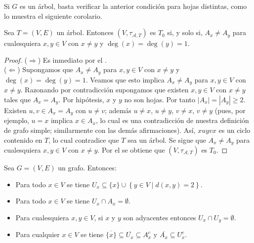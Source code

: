 Si $G$ es un árbol, basta verificar la anterior condición para hojas distintas, como lo muestra el siguiente corolario.
\begin{Cor}
   Sea $T=(V,E)$ un árbol. Entonces $(V,\tau_{\mathcal{A},T})$ es $T_0$ si, y solo si, $A_x\ne A_y$ para cualesquiera $x,y\in V$ con $x\ne y$ y $\operatorname{deg}(x)=\operatorname{deg}(y)=1$.
\end{Cor}
\begin{proof}
   ($\Rightarrow$) Es inmediato por el .\\
   ($\Leftarrow$) Supongamos que $A_x\ne A_y$ para $x,y\in V$ con $x\ne y$ y $\operatorname{deg}(x)=\operatorname{deg}(y)=1$. Veamos que esto implica $A_x\ne A_y$ para $x,y\in V$ con $x\ne y$. Razonando por contradicción supongamos que existen $x,y\in V$ con $x\ne y$ tales que $A_x=A_y$. Por hipótesis, $x$ y $y$ no son hojas. Por tanto $|A_x|=|A_y|\ge 2$. Existen $u,v\in A_x = A_y$ con $u\ne v$; además $u\ne x$, $u\ne y$, $v\ne x$, $v\ne y$ (pues, por ejemplo, $u=x$ implica $x\in A_x$, lo cual es una contradicción de nuestra definición de grafo simple; similarmente con las demás afirmaciones). Así, $xuyvx$ es un ciclo contenido en $T$, lo cual contradice que $T$ sea un árbol. Se sigue que $A_x\ne A_y$ para cualesquiera $x,y\in V$ con $x\ne y$. Por el  se obtiene que $(V,\tau_{\mathcal{A},T})$ es $T_0$.
\end{proof}
\begin{Cor}\label{Cor:U_x_3}
    Sea $G=(V,E)$ un grafo. Entonces:
    \begin{itemize}
       \item[1.] Para todo $x\in V$ se tiene $U_x\subseteq \{x\}\cup \left\lbrace y\in V\mid d(x,y)=2\right\rbrace$.
       \item[2.] Para todo $x\in V$ se tiene $U_x\cap A_x=\emptyset$.
       \item[3.] Para cualesquiera $x,y\in V$, si $x$ y $y$ son adyacentes entonces $U_x\cap U_y=\emptyset$.
      \item[4.] Para cualquier $x\in V$ se tiene $\overline{\{x\}}\subseteq \overline{U_x}\subseteq A_x^c$ y $\overline{A_x}\subseteq U_x^c$.
    \end{itemize}
\end{Cor}
